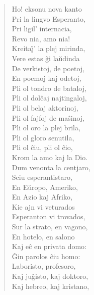 \begin{verse}
                        Ho! eksonu nova kanto\\
                        Pri la lingvo Esperanto,\\
                        Pri ligil' internacia,\\
                        Revo nia, amo nia!\\
                        Kreita\^{\j}' la plej mirinda,\\
                        Vere estas \^gi la\u udinda\\
                        De verkistoj, de poetoj,\\
                        En poemoj kaj odetoj,\\
                        Pli ol tondro de bataloj,\\
                        Pli ol dol\^caj najtingaloj,\\
                        Pli ol belaj aktorinoj,\\
                        Pli ol fajfoj de ma\^sinoj,\\
                        Pli ol oro la plej brila,\\
                        Pli ol gloro senutila,\\
                        Pli ol \^ciu, pli ol \^cio,\\
                        Krom la amo kaj la Dio.\\
                        Dum venonta la centjaro,\\
                        Sciu esperantistaro,\\
                        En E\u uropo, Ameriko,\\
                        En Azio kaj Afriko,\\
                        Kie ajn vi veturados\\
                        Esperanton vi trovados,\\
                        Sur la strato, en vagono,\\
                        En hotelo, en salono\\
                        Kaj e\^c en privata domo:\\
                        \^Gin parolos \^ciu homo:\\
                        Laboristo, profesoro,\\
                        Kaj ju\^gisto, kaj doktoro,\\
                        Kaj hebreo, kaj kristano,\\

\end{verse}
